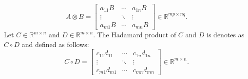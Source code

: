 \documentclass[a4paper]{cas-sc}
\begin{document}
\begin{itemize}
\begin{equation*}
A \otimes B = \left[ {\begin{array}{*{20}{c}}
  {{a_{11}}B} & \cdots & {{a_{1n}}B} \\
  \vdots      & \ddots & \vdots      \\
  {{a_{m1}}B} & \cdots & {{a_{mn}}B}
\end{array}} \right] \in {\mathbb{R}^{mp \times nq}}.
\end{equation*}
Let $C \in {\mathbb{R}^{m \times n}}$ and $D \in {\mathbb{R}^{m \times n}}$. The Hadamard product of $C$ and $D$ is denotes as $C \circ D$ and defined as follows:
\begin{equation*}
C \circ D = \left[ {\begin{array}{*{20}{c}}
  {{c_{11}}{d_{11}}} & \cdots & {{c_{1n}}{d_{1n}}} \\
  \vdots             & \ddots & \vdots             \\
  {{c_{m1}}{d_{m1}}} & \cdots & {{c_{mn}}{d_{mn}}}
\end{array}} \right] \in {\mathbb{R}^{m \times n}}.
\end{equation*}
\end{itemize}
\end{document}
